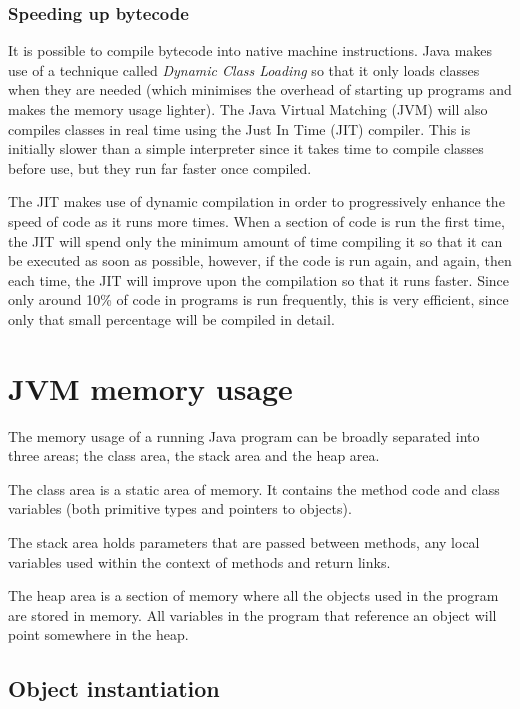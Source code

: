 \subsubsection{Speeding up bytecode}

It is possible to compile bytecode into native machine instructions. Java makes
use of a technique called {\it Dynamic Class Loading} so that it only loads
classes when they are needed (which minimises the overhead of starting up
programs and makes the memory usage lighter). The Java Virtual Matching (JVM)
will also compiles classes in real time using the Just In Time (JIT) compiler.
This is initially slower than a simple interpreter since it takes time to
compile classes before use, but they run far faster once compiled.

The JIT makes use of dynamic compilation in order to progressively enhance the
speed of code as it runs more times. When a section of code is run the first
time, the JIT will spend only the minimum amount of time compiling it so that it
can be executed as soon as possible, however, if the code is run again, and
again, then each time, the JIT will improve upon the compilation so that it runs
faster. Since only around 10\% of code in programs is run frequently, this is
very efficient, since only that small percentage will be compiled in detail.

\section{JVM memory usage}

The memory usage of a running Java program can be broadly separated into three
areas; the class area, the stack area and the heap area.

The class area is a static area of memory. It contains the method code and
class variables (both primitive types and pointers to objects).

The stack area holds parameters that are passed between methods, any local
variables used within the context of methods and return links.

The heap area is a section of memory where all the objects used in the program
are stored in memory. All variables in the program that reference an object
will point somewhere in the heap.


\subsection{Object instantiation}

